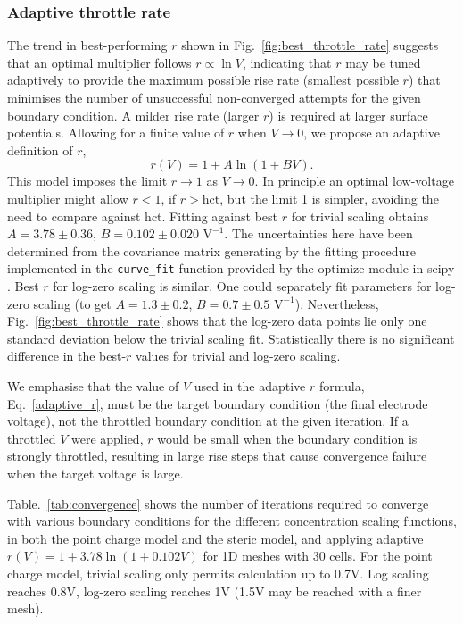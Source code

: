 \subsubsection{Adaptive throttle rate}
The trend in best-performing $r$ shown in Fig.~\ref{fig:best_throttle_rate} suggests that an
optimal multiplier follows
$r \propto \ln V$, indicating that $r$ 
may be tuned adaptively to provide the maximum possible rise rate (smallest
possible $r$) that minimises the number of unsuccessful non-converged
attempts for the given boundary condition.  A milder
rise rate (larger $r$) is required at larger surface potentials.
Allowing for a finite value of $r$ when $V \rightarrow 0$, we propose
an adaptive definition of $r$,
\begin{equation}
  r(V) = 1 + A \ln(1 + B V).
  \label{adaptive_r}
\end{equation}
This model imposes the limit $r \rightarrow 1$ as $V \rightarrow 0$.
In principle an optimal low-voltage multiplier might allow $r<1$, if
$r>$hct, but the limit 1 is simpler, avoiding the need to 
compare against hct.  Fitting against best $r$ for trivial scaling
obtains $A=3.78 \pm 0.36$, $B=0.102 \pm 0.020 \textrm{ V}^{-1}$.
The uncertainties here have been determined from the covariance matrix
generating by the fitting procedure implemented in the
\verb|curve_fit| function provided by the optimize module in scipy
\cite{VugrinSwilerRobertsStuckyMackSullivan2007}. 
 Best $r$ for log-zero scaling is similar. One could separately fit
 parameters for log-zero scaling (to get
 $A=1.3\pm 0.2$, $B=0.7 \pm 0.5 \textrm{ V}^{-1}$).
 Nevertheless,  Fig.~\ref{fig:best_throttle_rate} shows that the
 log-zero data points lie only one standard deviation below the trivial
scaling fit. Statistically there is no significant difference in the
best-$r$ values for trivial and log-zero scaling.

We emphasise that the value of $V$ used in the adaptive $r$ formula, Eq.~\eqref{adaptive_r},
must be the target boundary condition (the final electrode voltage),
not the throttled boundary condition at the given iteration.  If a throttled $V$ were
applied, $r$ would be small when the boundary condition is strongly
throttled, resulting in large rise steps that cause convergence
failure when the  target voltage is large.


Table.~\ref{tab:convergence} shows  the number of iterations required
to converge with various boundary conditions for the different
concentration scaling functions, in both the point charge model and the
steric model, and applying adaptive
$r(V)=1+3.78\ln(1+0.102V)$ for 1D meshes with 30 cells. For the point charge model, trivial scaling only
permits calculation up to 0.7V. Log scaling reaches 0.8V, log-zero
scaling reaches 1V (1.5V may be reached with a finer mesh).

